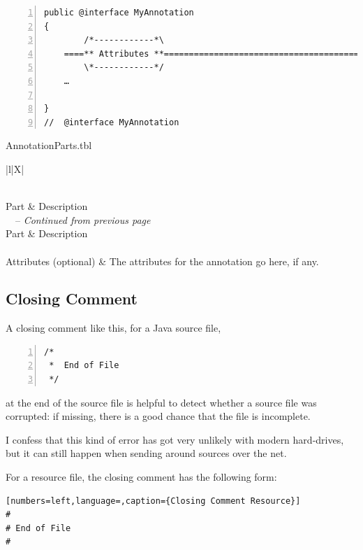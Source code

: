 \documentclass[11pt,a4paper, titlepage, parskip=half, headsepline, footsepline, cleardoublepage=current, headheight=1cm]{scrbook}
\begin{document}
\begin{lstlisting}[numbers=left,caption={Annotation Skeleton}]
public @interface MyAnnotation 
{
        /*------------*\
    ====** Attributes **=============================================
        \*------------*/
    …
                
}
//  @interface MyAnnotation
\end{lstlisting}
 
\begin{filecontents}{AnnotationParts.tbl}
  \begin{longtable}{|l|X|}
  \caption{Parts of an annotation declaration} \\
  \hline 
  Part & Description \\ 
  \hline
  \endfirsthead
  {\tablename\ \thetable\ -- \textit{Continued from previous page}} \\
  \hline 
  Part & Description \\ 
  \hline
  \endhead
   \\ 
  \endfoot
  \endlastfoot
  Attributes (optional) & The attributes for the annotation go here, if any. \\ 
  \hline 
 \end{longtable} 
\end{filecontents}

\subsection{Closing Comment}\label{sec:ClosingComment}
A closing comment like this, for a Java source file,
\begin{lstlisting}[numbers=left, caption={Closing Comment Java}]
/*
 *  End of File
 */
\end{lstlisting}
at the end of the source file is helpful to detect whether a source file was corrupted: if missing, there is a good chance that the file is incomplete.

I confess that this kind of error has got very unlikely with modern hard-drives, but it can still happen when sending around sources over the net.

For a resource file, the closing comment has the following form: 
\begin{lstlisting}[numbers=left,language=,caption={Closing Comment Resource}]
#
# End of File
#
\end{lstlisting}
\end{document}
